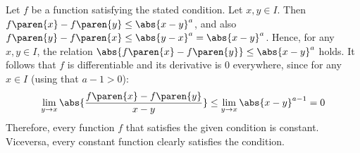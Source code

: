 Let $f$ be a function satisfying the stated condition.
Let $x, y \in I$.
Then $f\paren{x} - f\paren{y} \leq \abs{x - y}^{a}$,
and also $f\paren{y} - f\paren{x} \leq \abs{y - x}^{a} = \abs{x - y}^{a}$.
Hence, for any $x, y \in I$, the relation
$\abs{f\paren{x} - f\paren{y}} \leq \abs{x - y}^{a}$ holds.
It follows that $f$ is differentiable and its derivative is $0$ everywhere,
since for any $x \in I$ (using that $a - 1 > 0$):
\begin{equation*}
  \lim\limits_{y \to x} {\abs{\frac{f\paren{x} - f\paren{y}}{x - y}}}
  \leq \lim\limits_{y \to x} {\abs{x - y}^{a - 1}}
  = 0
\end{equation*}
Therefore, every function $f$ that satisfies the given condition is constant.
Viceversa, every constant function clearly satisfies the condition.
